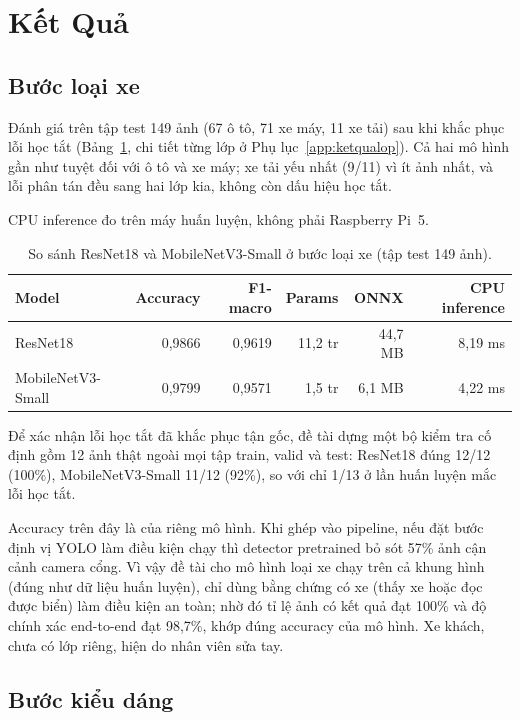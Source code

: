\section{Kết Quả}
\label{sec:phanloai-ketqua}

\subsection{Bước loại xe}

Đánh giá trên tập test 149 ảnh (67 ô tô, 71 xe máy, 11 xe tải) sau khi khắc phục lỗi học tắt
(Bảng~\ref{tab:vt-results}, chi tiết từng lớp ở Phụ lục~\ref{app:ketqualop}). Cả hai mô hình
gần như tuyệt đối với ô tô và xe máy; xe tải yếu nhất (9/11) vì ít ảnh nhất, và lỗi phân tán
đều sang hai lớp kia, không còn dấu hiệu học tắt.

\begin{table}[htbp]
\centering
\caption{So sánh ResNet18 và MobileNetV3-Small ở bước loại xe (tập test 149 ảnh).}
\label{tab:vt-results}
{\footnotesize CPU inference đo trên máy huấn luyện, không phải Raspberry Pi~5.}
\begin{tabular}{lrrrrr}
\toprule
\textbf{Model} & \textbf{Accuracy} & \textbf{F1-macro} & \textbf{Params} & \textbf{ONNX} & \textbf{CPU inference} \\
\midrule
ResNet18 & 0,9866 & 0,9619 & 11,2 tr & 44,7 MB & 8,19 ms \\
MobileNetV3-Small & 0,9799 & 0,9571 & 1,5 tr & 6,1 MB & 4,22 ms \\
\bottomrule
\end{tabular}
\end{table}

Để xác nhận lỗi học tắt đã khắc phục tận gốc, đề tài dựng một bộ kiểm tra cố định gồm 12 ảnh
thật ngoài mọi tập train, valid và test: ResNet18 đúng 12/12 (100\%), MobileNetV3-Small 11/12
(92\%), so với chỉ 1/13 ở lần huấn luyện mắc lỗi học tắt.

Accuracy trên đây là của riêng mô hình. Khi ghép vào pipeline, nếu đặt bước định vị YOLO làm
điều kiện chạy thì detector pretrained bỏ sót 57\% ảnh cận cảnh camera cổng. Vì vậy đề tài cho mô hình loại xe chạy trên cả khung hình (đúng như dữ liệu
huấn luyện), chỉ dùng bằng chứng có xe (thấy xe hoặc đọc được biển) làm điều kiện an toàn;
nhờ đó tỉ lệ ảnh có kết quả đạt 100\% và độ chính xác end-to-end đạt 98,7\%, khớp đúng
accuracy của mô hình. Xe khách, chưa có lớp riêng, hiện do nhân viên sửa tay.

\subsection{Bước kiểu dáng}

